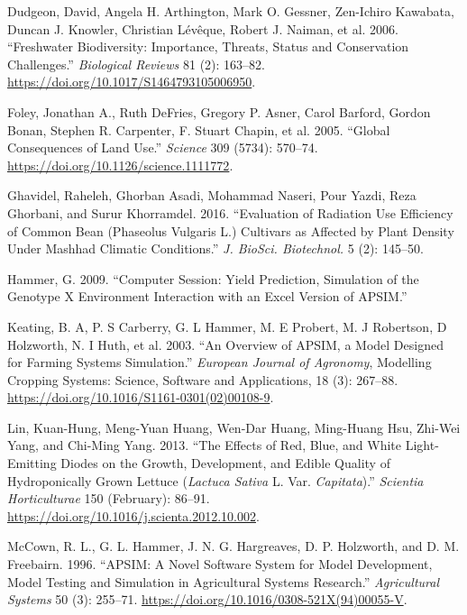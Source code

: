 \documentclass[
]{article}
\newlength{\cslhangindent}
\newenvironment{CSLReferences}[2] %
 {\begin{list}{}{%
  \setlength{\itemindent}{0pt}
  \setlength{\leftmargin}{0pt}
  \setlength{\parsep}{0pt}
  \ifodd #1
   \setlength{\leftmargin}{\cslhangindent}
   \setlength{\itemindent}{-1\cslhangindent}
  \fi
  \setlength{\itemsep}{#2\baselineskip}}}
 {\end{list}}
\begin{document}
\begin{CSLReferences}{1}{0}
Dudgeon, David, Angela H. Arthington, Mark O. Gessner, Zen-Ichiro
Kawabata, Duncan J. Knowler, Christian Lévêque, Robert J. Naiman, et al.
2006. {``Freshwater Biodiversity: Importance, Threats, Status and
Conservation Challenges.''} \emph{Biological Reviews} 81 (2): 163--82.
\url{https://doi.org/10.1017/S1464793105006950}.

Foley, Jonathan A., Ruth DeFries, Gregory P. Asner, Carol Barford,
Gordon Bonan, Stephen R. Carpenter, F. Stuart Chapin, et al. 2005.
{``Global {Consequences} of {Land} {Use}.''} \emph{Science} 309 (5734):
570--74. \url{https://doi.org/10.1126/science.1111772}.

Ghavidel, Raheleh, Ghorban Asadi, Mohammad Naseri, Pour Yazdi, Reza
Ghorbani, and Surur Khorramdel. 2016. {``Evaluation of Radiation Use
Efficiency of Common Bean ({Phaseolus} Vulgaris {L}.) Cultivars as
Affected by Plant Density Under {Mashhad} Climatic Conditions.''}
\emph{J. BioSci. Biotechnol.} 5 (2): 145--50.

Hammer, G. 2009. {``Computer Session: Yield Prediction, Simulation of
the Genotype {X} Environment Interaction with an {Excel} Version of
{APSIM}.''}

Keating, B. A, P. S Carberry, G. L Hammer, M. E Probert, M. J Robertson,
D Holzworth, N. I Huth, et al. 2003. {``An Overview of {APSIM}, a Model
Designed for Farming Systems Simulation.''} \emph{European Journal of
Agronomy}, Modelling {Cropping} {Systems}: {Science}, {Software} and
{Applications}, 18 (3): 267--88.
\url{https://doi.org/10.1016/S1161-0301(02)00108-9}.

Lin, Kuan-Hung, Meng-Yuan Huang, Wen-Dar Huang, Ming-Huang Hsu, Zhi-Wei
Yang, and Chi-Ming Yang. 2013. {``The Effects of Red, Blue, and White
Light-Emitting Diodes on the Growth, Development, and Edible Quality of
Hydroponically Grown Lettuce (\emph{{Lactuca} Sativa} {L}. Var.
\emph{Capitata}).''} \emph{Scientia Horticulturae} 150 (February):
86--91. \url{https://doi.org/10.1016/j.scienta.2012.10.002}.

McCown, R. L., G. L. Hammer, J. N. G. Hargreaves, D. P. Holzworth, and
D. M. Freebairn. 1996. {``{APSIM}: A Novel Software System for Model
Development, Model Testing and Simulation in Agricultural Systems
Research.''} \emph{Agricultural Systems} 50 (3): 255--71.
\url{https://doi.org/10.1016/0308-521X(94)00055-V}.


\end{CSLReferences}
\end{document}
